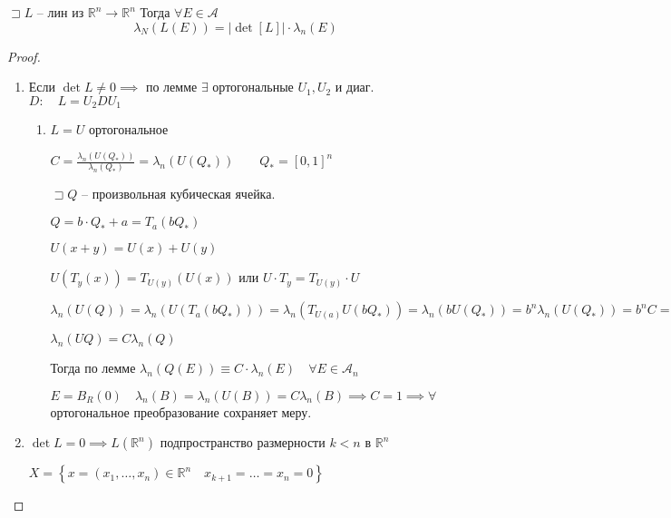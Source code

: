 \documentclass{book}
\newcommand\R{\ensuremath{\mathbb{R}}}
\theoremstyle{definition}
\begin{document}
\begin{theorem}
    $\sqsupset L$ -- лин из $\R^n\to \R^n$ Тогда $\forall E\in \mathcal A$ \[\lambda_N\left( L(E) \right)  = \left| \det \left[ L \right]  \right| \cdot \lambda_n(E)\]
\end{theorem}
\begin{proof}
    \begin{enumerate}
        \item Если $\det L \neq 0 \implies $ по лемме $\exists $ ортогональные $U_1, U_2$ и диаг. $D:\quad L = U_2DU_1$
            \begin{enumerate}
                \item $L = U$ ортогональное

                    $C = \frac{\lambda_n\left( U\left( Q_* \right)  \right) }{\lambda_n\left( Q_* \right) } = \lambda_n\left( U\left( Q_* \right)  \right) \qquad Q_* = [0,1]^n$ 

                    $\sqsupset Q$ -- произвольная кубическая ячейка.

                    $Q = b\cdot Q_* + a = T_a\left( bQ_* \right) $

                    $U\left( x+y \right)  = U(x)  + U(y)$

                   $U\left( T_y(x) \right)  = T_{U\left( y \right) }\left( U(x) \right) $ или $U\cdot T_y = T_{U(y)}\cdot U$

                    $\lambda_n\left( U(Q) \right) = \lambda_n\left( U\left( T_a\left( bQ_* \right)  \right)  \right)  = \lambda_n\left( T_{U(a)}U\left( bQ_* \right)  \right) = \lambda_n\left( bU\left( Q_* \right)  \right) =b^n\lambda_n\left( U\left( Q_* \right)  \right)  = b^nC = \lambda_n(Q)C $ 

                    $\lambda_n\left( UQ \right) =C\lambda_n\left( Q \right) $

                    Тогда по лемме $\lambda_n\left( Q(E) \right) \equiv C\cdot \lambda_n(E)\quad \forall E\in \mathcal A_n$

                    $E = B_R(0)\quad \lambda_n(B) = \lambda_n(U(B)) = C\lambda_n(B) \implies C = 1 \implies \forall  $ ортогональное преобразование сохраняет меру.
            \end{enumerate}
        \item $\det L = 0\implies L\left( \R^n \right) $ подпространство размерности $k<n$ в  $\R^n$

            $X = \left\{ x = \left( x_1, \ldots, x_{n}  \right) \in \R^n\quad x_{k+1} = \ldots = x_{n}  = 0 \right\} $


\end{enumerate}
\end{proof}
\end{document}
